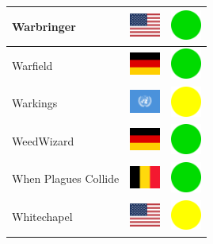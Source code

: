 \documentclass[12pt, a4paper, twoside]{report}
\begin{document}
\begin{center}
\begin{longtable}{|p{5cm}|p{2cm}|p{2cm}|}
Warbringer & \includegraphics[width=1cm]{4x3/us} & \includegraphics[width=1cm]{likes/y} \\ \hline
Warfield & \includegraphics[width=1cm]{4x3/de} & \includegraphics[width=1cm]{likes/y} \\ \hline
Warkings & \includegraphics[width=1cm]{4x3/un} & \includegraphics[width=1cm]{likes/m} \\ \hline
WeedWizard & \includegraphics[width=1cm]{4x3/de} & \includegraphics[width=1cm]{likes/y} \\ \hline
When Plagues Collide & \includegraphics[width=1cm]{4x3/be} & \includegraphics[width=1cm]{likes/y} \\ \hline
Whitechapel & \includegraphics[width=1cm]{4x3/us} & \includegraphics[width=1cm]{likes/m} \\ \hline

\end{longtable}
\end{center}
\end{document}
